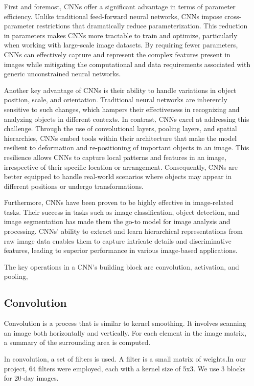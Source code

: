 \documentclass{article}
\begin{document}
First and foremost, CNNs offer a significant advantage in terms of parameter efficiency. Unlike traditional feed-forward neural networks, CNNs impose cross-parameter restrictions that dramatically reduce parameterization. This reduction in parameters makes CNNs more tractable to train and optimize, particularly when working with large-scale image datasets. By requiring fewer parameters, CNNs can effectively capture and represent the complex features present in images while mitigating the computational and data requirements associated with generic unconstrained neural networks.

Another key advantage of CNNs is their ability to handle variations in object position, scale, and orientation. Traditional neural networks are inherently sensitive to such changes, which hampers their effectiveness in recognizing and analyzing objects in different contexts. In contrast, CNNs excel at addressing this challenge. Through the use of convolutional layers, pooling layers, and spatial hierarchies, CNNs embed tools within their architecture that make the model resilient to deformation and re-positioning of important objects in an image. This resilience allows CNNs to capture local patterns and features in an image, irrespective of their specific location or arrangement. Consequently, CNNs are better equipped to handle real-world scenarios where objects may appear in different positions or undergo transformations.

Furthermore, CNNs have been proven to be highly effective in image-related tasks. Their success in tasks such as image classification, object detection, and image segmentation has made them the go-to model for image analysis and processing. CNNs' ability to extract and learn hierarchical representations from raw image data enables them to capture intricate details and discriminative features, leading to superior performance in various image-based applications. 

The key operations in a CNN's building block are convolution, activation, and pooling, 

\subsection{Convolution}
Convolution is a process that is similar to kernel smoothing. It involves scanning an image both horizontally and vertically. For each element in the image matrix, a summary of the surrounding area is computed.

In convolution, a set of filters is used. A filter is a small matrix of weights.In our project, 64 filters were employed, each with a kernel size of 5x3. We use 3 blocks for 20-day images. 
\end{document}
